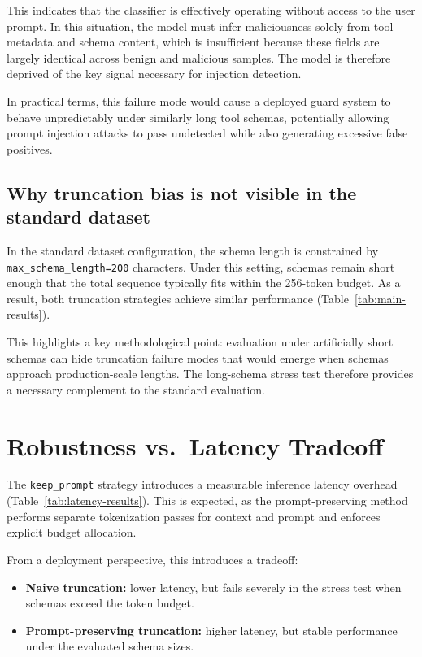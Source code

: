 This indicates that the classifier is effectively operating without access to the user prompt. In this situation, the model must infer maliciousness solely from tool metadata and schema content, which is insufficient because these fields are largely identical across benign and malicious samples. The model is therefore deprived of the key signal necessary for injection detection.

In practical terms, this failure mode would cause a deployed guard system to behave unpredictably under similarly long tool schemas, potentially allowing prompt injection attacks to pass undetected while also generating excessive false positives.

\subsection{Why truncation bias is not visible in the standard dataset}

In the standard dataset configuration, the schema length is constrained by \texttt{max\_schema\_length=200} characters. Under this setting, schemas remain short enough that the total sequence typically fits within the 256-token budget. As a result, both truncation strategies achieve similar performance (Table~\ref{tab:main-results}).

This highlights a key methodological point: evaluation under artificially short schemas can hide truncation failure modes that would emerge when schemas approach production-scale lengths. The long-schema stress test therefore provides a necessary complement to the standard evaluation.

\section{Robustness vs.\ Latency Tradeoff}
\label{subsec:discussion_tradeoffs}

The \texttt{keep\_prompt} strategy introduces a measurable inference latency overhead (Table~\ref{tab:latency-results}). This is expected, as the prompt-preserving method performs separate tokenization passes for context and prompt and enforces explicit budget allocation.

From a deployment perspective, this introduces a tradeoff:
\begin{itemize}
    \item \textbf{Naive truncation:} lower latency, but fails severely in the stress test when schemas exceed the token budget.
    \item \textbf{Prompt-preserving truncation:} higher latency, but stable performance under the evaluated schema sizes.
\end{itemize}

